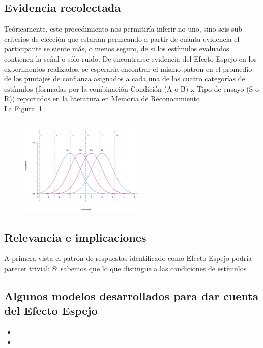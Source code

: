 
\subsection{Evidencia recolectada}

Teóricamente, este procedimiento nos permitiría inferir no uno, sino seis sub-criterios de elección que estarían permeando a partir de cuánta evidencia el participante se siente más, o menos seguro, de si los estímulos evaluados contienen la señal o sólo ruido. De encontrarse evidencia del Efecto Espejo en los experimentos realizados, se esperaría encontrar el mismo patrón en el promedio de los puntajes de confianza asignados a cada una de las cuatro categorías de estímulos (formadas por la combinación Condición (A o B) x Tipo de ensayo (S o R)) reportados en la literatura en Memoria de Reconocimiento \parencite{Glanzer1990, Glanzer1993}. \\

La Figura~\ref{fig:Ejem_Crit} 

\begin{figure}[th]
\centering
\includegraphics[width=0.55\textwidth]{Figures/Ejem_Criterios}
\caption[Representación gráfica de los sub-Criterios para la emisión de puntajes de confianza ]{}
\label{fig:Ejem_Crit}
\end{figure}



\subsection{Relevancia e implicaciones}
A primera vista el patrón de respuestas identificado como Efecto Espejo podría parecer trivial: Si sabemos que lo que distingue a las condiciones de estímulos 

\subsection{Algunos modelos desarrollados para dar cuenta del Efecto Espejo}

\begin{itemize} 
\item
\item
\end{itemize}



